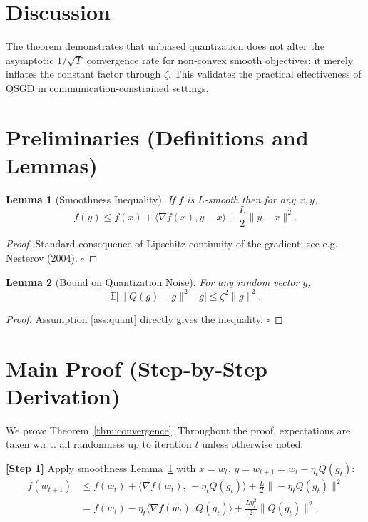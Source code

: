 \documentclass{article}
\newtheorem{lemma}{Lemma}
\begin{document}
\section*{Discussion}
The theorem demonstrates that unbiased quantization does not alter the asymptotic $1/\sqrt{T}$ convergence rate for non‑convex smooth objectives; it merely inflates the constant factor through $\zeta$. This validates the practical effectiveness of QSGD in communication‑constrained settings.

\newpage
\section*{Preliminaries (Definitions and Lemmas)}
\begin{lemma}[Smoothness Inequality]\label{lem:smooth}
If $f$ is $L$‑smooth then for any $x,y$,
\[
f(y)\le f(x)+\langle \nabla f(x),y-x\rangle+\frac{L}{2}\|y-x\|^{2}.
\]
\end{lemma}
\begin{proof}
Standard consequence of Lipschitz continuity of the gradient; see e.g. Nesterov (2004). \hfill $\square$
\end{proof}

\begin{lemma}[Bound on Quantization Noise]\label{lem:quant}
For any random vector $g$,
\[
\mathbb{E}\!\big[\|Q(g)-g\|^{2}\mid g\big]\le \zeta^{2}\|g\|^{2}.
\]
\end{lemma}
\begin{proof}
Assumption \ref{ass:quant} directly gives the inequality. \hfill $\square$
\end{proof}

\section*{Main Proof (Step‑by‑Step Derivation)}
We prove Theorem~\ref{thm:convergence}. Throughout the proof, expectations are taken w.r.t. all randomness up to iteration $t$ unless otherwise noted.

\noindent\textbf{[Step 1]} Apply smoothness Lemma~\ref{lem:smooth} with $x=w_{t}$, $y=w_{t+1}=w_{t}-\eta_{t}Q(g_{t})$:
\begin{align}
f(w_{t+1}) &\le f(w_{t})+\big\langle \nabla f(w_{t}),\, -\eta_{t}Q(g_{t})\big\rangle
            +\frac{L}{2}\big\|-\eta_{t}Q(g_{t})\big\|^{2}\nonumber\\
           &= f(w_{t})-\eta_{t}\langle \nabla f(w_{t}),Q(g_{t})\rangle
              +\frac{L\eta_{t}^{2}}{2}\|Q(g_{t})\|^{2}. \tag{5}
\end{align}
\end{document}
